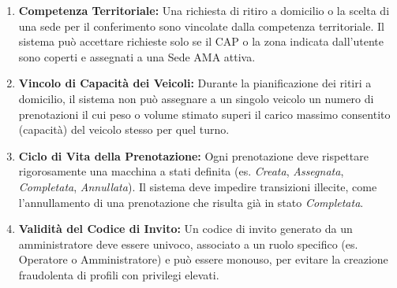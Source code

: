 \begin{enumerate}[leftmargin=*, label=\textbf{RD-\arabic*.}]
    \item \textbf{Competenza Territoriale:} Una richiesta di ritiro a domicilio o la scelta di una sede per il conferimento sono vincolate dalla competenza territoriale. Il sistema può accettare richieste solo se il CAP o la zona indicata dall'utente sono coperti e assegnati a una Sede AMA attiva.
    \item \textbf{Vincolo di Capacità dei Veicoli:} Durante la pianificazione dei ritiri a domicilio, il sistema non può assegnare a un singolo veicolo un numero di prenotazioni il cui peso o volume stimato superi il carico massimo consentito (capacità) del veicolo stesso per quel turno.
    \item \textbf{Ciclo di Vita della Prenotazione:} Ogni prenotazione deve rispettare rigorosamente una macchina a stati definita (es. \textit{Creata}, \textit{Assegnata}, \textit{Completata}, \textit{Annullata}). Il sistema deve impedire transizioni illecite, come l'annullamento di una prenotazione che risulta già in stato \textit{Completata}.
    \item \textbf{Validità del Codice di Invito:} Un codice di invito generato da un amministratore deve essere univoco, associato a un ruolo specifico (es. Operatore o Amministratore) e può essere monouso, per evitare la creazione fraudolenta di profili con privilegi elevati.
\end{enumerate}
